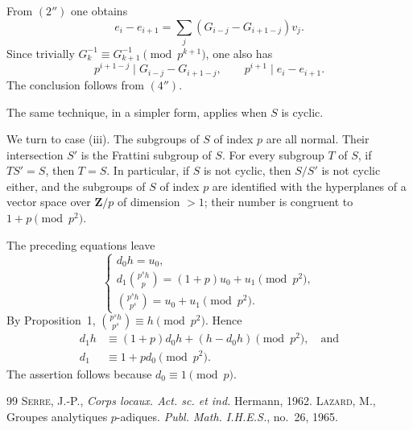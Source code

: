 \documentclass[12pt]{amsart}
\theoremstyle{plain}
\begin{document}
From $(2'')$ one obtains
\[
e_i-e_{i+1}=\sum_j (G_{i-j}-G_{i+1-j})v_j.
\]
Since trivially $G_k^{-1}\equiv G_{k+1}^{-1}\pmod {p^{k+1}}$, one also has
\[
p^{i+1-j}\mid G_{i-j}-G_{i+1-j},\qquad p^{i+1}\mid e_i-e_{i+1}.
\]
The conclusion follows from $(4'')$.

The same technique, in a simpler form, applies when $S$ is cyclic.

We turn to case (iii). The subgroups of $S$ of index $p$ are all normal. Their intersection $S'$ is the Frattini subgroup of $S$. For every subgroup $T$ of $S$, if $TS'=S$, then $T=S$. In particular, if $S$ is not cyclic, then $S/S'$ is not cyclic either, and the subgroups of $S$ of index $p$ are identified with the hyperplanes of a vector space over $\mathbf Z/p$ of dimension $>1$; their number is congruent to $1+p\pmod {p^2}$.

The preceding equations leave
\[
\begin{cases}
d_0 h=u_0,\\[4pt]
d_1\binom{p^s h}{p}=(1+p)u_0+u_1\pmod {p^2},\\[4pt]
\binom{p^s h}{p^s}=u_0+u_1\pmod {p^2}.
\end{cases}
\]
By Proposition~1, $\binom{p^s h}{p^s}\equiv h\pmod {p^2}$. Hence
\begin{align*}
d_1h&\equiv (1+p)d_0h+(h-d_0h)\pmod {p^2},\quad\text{and}\\
d_1&\equiv 1+pd_0\pmod {p^2}.
\end{align*}
The assertion follows because $d_0\equiv 1\pmod p$.

\begin{thebibliography}{99}
 \textsc{Serre, J.-P.}, \textit{Corps locaux. Act. sc. et ind.} Hermann, 1962.
 \textsc{Lazard, M.}, Groupes analytiques $p$-adiques. \textit{Publ. Math. I.H.E.S.}, no.~26, 1965.
\end{thebibliography}
\end{document}
